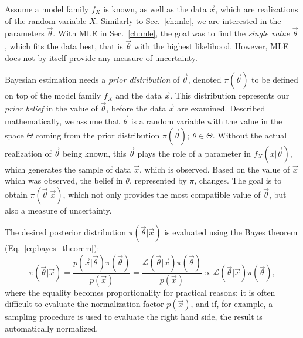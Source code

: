 Assume a model family $f_X$ is known, as well as the data $\vec{x}$, which are realizations of the random variable $X$. Similarly to Sec.~\ref{ch:mle}, we are interested in the parameters $\vec{\theta}$. With MLE in Sec.~\ref{ch:mle}, the goal was to find the \textit{single value} $\vec{\theta}$, which fits the data best, that is $\vec{\theta}$ with the highest likelihood. However, MLE does not by itself provide any measure of uncertainty. 

Bayesian estimation needs a \textit{prior distribution} of $\vec{\theta}$, denoted $\pi(\vec{\theta})$ to be defined on top of the model family $f_X$ and the data $\vec{x}$. This distribution represents our \textit{prior belief} in the value of $\vec{\theta}$, before the data $\vec{x}$ are examined. Described mathematically, we assume that $\vec{\theta}$ is a random variable with the value in the space $\Theta$ coming from the prior distribution $\pi(\vec{\theta}); \ \theta \in \Theta$. Without the actual realization of $\vec{\theta}$ being known, this $\vec{\theta}$ plays the role of a parameter in $f_X(x|\vec{\theta})$, which generates the sample of data $\vec{x}$, which is observed. Based on the value of $\vec{x}$ which was observed, the belief in $\theta$, represented by $\pi$, changes. The goal is to obtain $\pi(\vec{\theta}|\vec{x})$, which not only provides the most compatible value of $\vec{\theta}$, but also a measure of uncertainty. 

The desired posterior distribution $\pi(\vec{\theta}|\vec{x})$ is evaluated using the Bayes theorem (Eq.~\ref{eq:bayes_theorem}):
\begin{equation}
    \pi(\vec{\theta}|\vec{x}) = \frac{p(\vec{x}|\vec{\theta}) \pi(\vec{\theta})}{p(\vec{x})} = \frac{\mathcal{L}(\vec{\theta}|\vec{x}) \pi(\vec{\theta})}{p(\vec{x})} \propto \mathcal{L}(\vec{\theta}|\vec{x}) \pi(\vec{\theta}),
    \label{eq:bayesian_inference}
\end{equation}
where the equality becomes proportionality for practical reasons: it is often difficult to evaluate the normalization factor $p(\vec{x})$, and if, for example, a sampling procedure is used to evaluate the right hand side, the result is automatically normalized. 

